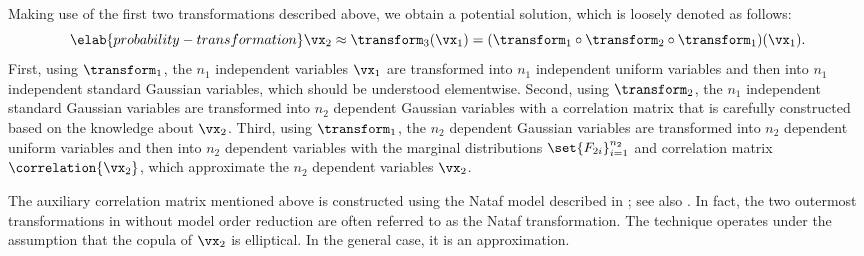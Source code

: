 Making use of the first two transformations described above, we obtain a
potential solution, which is loosely denoted as follows:
\begin{equation} \elab{probability-transformation}
  \vx_2 \approx \transform_3(\vx_1) = (\transform_1 \circ \transform_2 \circ \transform_1)(\vx_1).
\end{equation}
First, using $\transform_1$, the $n_1$ independent variables $\vx_1$ are
transformed into $n_1$ independent uniform variables and then into $n_1$
independent standard Gaussian variables, which should be understood elementwise.
Second, using $\transform_2$, the $n_1$ independent standard Gaussian variables
are transformed into $n_2$ dependent Gaussian variables with a correlation
matrix that is carefully constructed based on the knowledge about $\vx_2$.
Third, using $\transform_1$, the $n_2$ dependent Gaussian variables are
transformed into $n_2$ dependent uniform variables and then into $n_2$ dependent
variables with the marginal distributions $\set{F_{2i}}_{i = 1}^{n_2}$ and
correlation matrix $\correlation{\vx_2}$, which approximate the $n_2$ dependent
variables $\vx_2$.

The auxiliary correlation matrix mentioned above is constructed using the Nataf
model described in \cite{liu1986}; see also \cite{li2008}. In fact, the two
outermost transformations in  without model
order reduction are often referred to as the Nataf transformation. The technique
operates under the assumption that the copula of $\vx_2$ is elliptical. In the
general case, it is an approximation.
